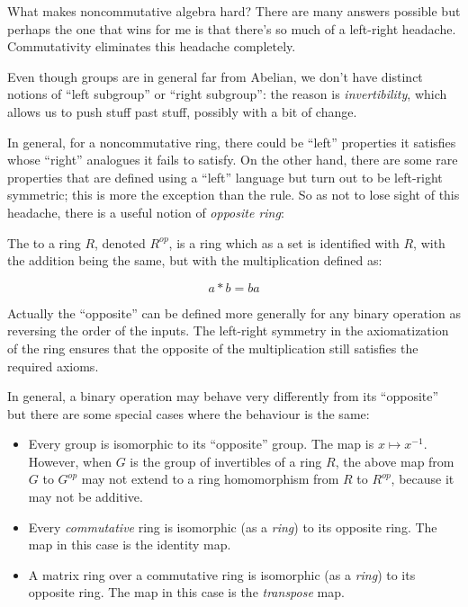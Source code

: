 \documentclass[a4paper]{amsart}
\begin{document}
What makes noncommutative algebra hard? There are many answers
possible but perhaps the one that wins for me is that there's so much
of a left-right headache. Commutativity eliminates this headache
completely.

Even though groups are in general far from Abelian, we don't have
distinct notions of ``left subgroup'' or ``right subgroup'': the
reason is {\em invertibility}, which allows us to push stuff past
stuff, possibly with a bit of change.

In general, for a noncommutative ring, there could be ``left''
properties it satisfies whose ``right'' analogues it fails to
satisfy. On the other hand, there are some rare properties that are
defined using a ``left'' language but turn out to be left-right
symmetric; this is more the exception than the rule. So as not to lose
sight of this headache, there is a useful notion of {\em opposite
  ring}:

\begin{definer}
  The  to a ring $R$, denoted $R^{op}$, is a
  ring which as a set is identified with $R$, with the addition being
  the same, but with the multiplication defined as:

  $$a * b = ba$$
\end{definer}

Actually the ``opposite'' can be defined more generally for any binary
operation as reversing the order of the inputs. The left-right symmetry in the
axiomatization of the ring ensures that the opposite of the
multiplication still satisfies the required axioms.

In general, a binary operation may behave very differently from its
``opposite'' but there are some special cases where the behaviour is
the same:

\begin{itemize}

\item Every group is isomorphic to its ``opposite'' group. The map is
  $x \mapsto x^{-1}$. However, when $G$ is the group of invertibles of
  a ring $R$, the above map from $G$ to $G^{op}$ may not extend to a
  ring homomorphism from $R$ to $R^{op}$, because it may not be
  additive.

\item Every {\em commutative} ring is isomorphic (as a {\em ring}) to
  its opposite ring. The map in this case is the identity map.

\item A matrix ring over a commutative ring is isomorphic (as a {\em
    ring}) to its opposite ring. The map in this case is the {\em
    transpose} map.

\end{itemize}
\end{document}

